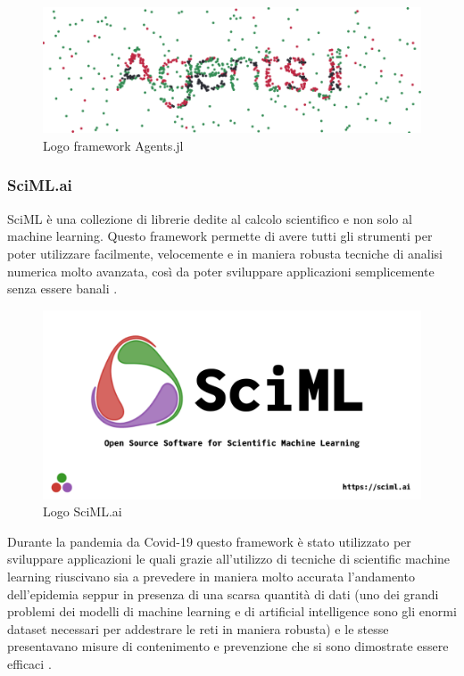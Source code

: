 \begin{figure}
    \includegraphics[width=\linewidth]{img/Agents_5poOwRo.png}
    \caption{Logo framework Agents.jl}
    \label{fig:Agents.jl_logo}
\end{figure}

\subsubsection{SciML.ai}
SciML è una collezione di librerie dedite al calcolo scientifico 
e non solo al machine learning. Questo framework permette di 
avere tutti gli strumenti per poter utilizzare facilmente, 
velocemente e in maniera robusta tecniche di analisi numerica 
molto avanzata, così da poter sviluppare applicazioni 
semplicemente senza essere banali 
\cite{rackauckas2017differentialequations} 
\cite{rackauckas2019diffeqflux} 
\cite{rackauckas2020universal}. 

\begin{figure}
    \includegraphics[width=\linewidth]{img/SciMLGitHubPreview.png}
    \caption{Logo SciML.ai}
    \label{fig:SciML.ai}
\end{figure}

Durante la pandemia da Covid-19 questo framework è stato 
utilizzato per sviluppare applicazioni le quali grazie 
all’utilizzo di tecniche di scientific machine learning 
riuscivano sia a prevedere in maniera molto accurata 
l’andamento dell’epidemia seppur in presenza di una scarsa 
quantità di dati (uno dei grandi problemi dei modelli di 
machine learning e di artificial intelligence sono gli enormi 
dataset necessari per addestrare le reti in maniera robusta) 
e le stesse presentavano misure di contenimento e prevenzione 
che si sono dimostrate essere efficaci 
\cite{10.1371/journal.pdig.0000142} \cite{DANDEKAR2021100220}. 

